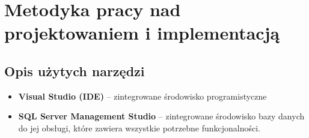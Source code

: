 \documentclass[a4paper,twoside,12pt]{book}
\begin{document}
%
%
%
%
%        



\chapter{Metodyka pracy nad projektowaniem i implementacją}
\label{ch:Metodyka}

\section{Opis użytych narzędzi}

\begin{itemize}
    \item \textbf{Visual Studio (IDE)} -- zintegrowane środowisko programistyczne  
    \item \textbf{SQL Server Management Studio} -- zintegrowane środowisko bazy danych do jej obsługi, które zawiera wszystkie potrzebne funkcjonalności. 
\end{itemize}
\end{document}
